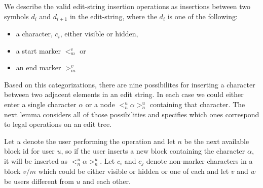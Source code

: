 \documentclass{amsart}
\begin{document}
We describe the valid edit-string insertion operations as insertions
between two symbols $d_i$ and $d_{i+1}$ in the edit-string, where the $d_i$
is one of the following:
\begin{itemize}
\item  a character, $c_i$, either visible or hidden,
\item  a start marker $<^v_m$ or
\item an end marker $>^v_m$
\end{itemize}
Based on this categorizations, there are nine possibilites for inserting a character between two adjacent elements in an edit string. In each case we could either enter a single character $\alpha$ or a node $<^u_n \alpha >^u_n$ containing that character. The next lemma considers all of those possibilities and specifies which ones correspond to legal operations on an edit tree.

Let $u$ denote the user performing
the operation and let $n$ be the next available block id for user $u$, so if
the user inserts a new block containing the character $\alpha$, it will be inserted
as $<^u_n \alpha >^u_n$.  Let $c_i$ and $c_j$ denote non-marker characters in
a block $v/m$ 
which could be either visible or hidden or one of each and let
 $v$ and $w$ be users different from $u$ and each other.
\end{document}
